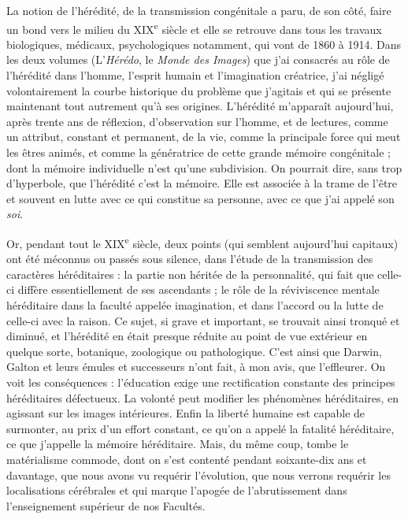 \documentclass[french,twoside]{book} %
\begin{document}
La notion de l’hérédité, de la transmission congénitale a paru, de son côté, faire un bond vers le milieu du XIX\textsuperscript{e} siècle et elle se retrouve dans tous les travaux biologiques, médicaux, psychologiques notamment, qui vont de 1860 à 1914. Dans les deux volumes (L’{\itshape Hérédo}, le {\itshape Monde des Images}) que j’ai consacrés au rôle de l’hérédité dans l’homme, l’esprit humain et l’imagination créatrice, j’ai négligé volontairement la courbe historique du problème que j’agitais et qui se présente maintenant tout autrement qu’à ses origines. L’hérédité m’apparaît aujourd’hui, après trente ans de réflexion, d’observation sur l’homme, et de lectures, comme un attribut, constant et permanent, de la vie, comme la principale force qui meut les êtres animés, et comme la génératrice de cette grande mémoire congénitale ; dont la mémoire individuelle n’est qu’une subdivision. On pourrait dire, sans trop d’hyperbole, que l’hérédité c’est la mémoire. Elle est associée à la trame de l’être et souvent en lutte avec ce qui constitue sa personne, avec ce que j’ai appelé son {\itshape soi}.\par
Or, pendant tout le XIX\textsuperscript{e} siècle, deux points (qui semblent aujourd’hui capitaux) ont été méconnus ou passés sous silence, dans l’étude de la transmission des caractères héréditaires : la partie non héritée de la personnalité, qui fait que celle-ci diffère essentiellement de ses ascendants ; le rôle de la réviviscence mentale héréditaire dans la faculté appelée imagination, et dans l’accord ou la lutte de celle-ci avec la raison. Ce sujet, si grave et important, se trouvait ainsi tronqué et diminué, et l’hérédité en était presque réduite au point de vue extérieur en quelque sorte, botanique, zoologique ou pathologique. C’est ainsi que Darwin, Galton et leurs émules et successeurs n’ont fait, à mon avis, que l’effleurer. On voit les conséquences : l’éducation exige une rectification constante des principes héréditaires défectueux. La volonté peut modifier les phénomènes héréditaires, en agissant sur les images intérieures. Enfin la liberté humaine est capable de surmonter, au prix d’un effort constant, ce qu’on a appelé la fatalité héréditaire, ce que j’appelle la mémoire héréditaire. Mais, du même coup, tombe le matérialisme commode, dont on s’est contenté pendant soixante-dix ans et davantage, que nous avons vu requérir l’évolution, que nous verrons requérir les localisations cérébrales et qui marque l’apogée de l’abrutissement dans l’enseignement supérieur de nos Facultés.\par
\end{document}
